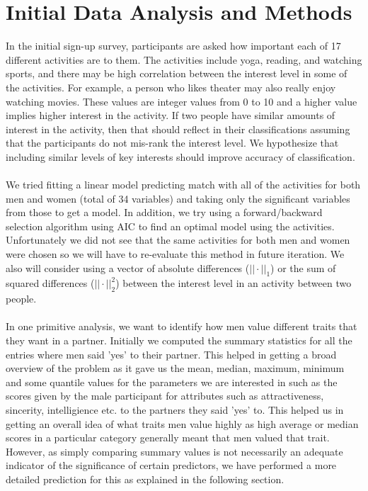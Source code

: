 \documentclass{article}
\begin{document}
\section{Initial Data Analysis and Methods}
In the initial sign-up survey, participants are asked how important each of 17 different activities are to them.  The activities include yoga, reading, and watching sports, and there may be high correlation between the interest level in some of the activities.  For example, a person who likes theater may also really enjoy watching movies.  These values are integer values from 0 to 10 and a higher value implies higher interest in the activity.  If two people have similar amounts of interest in the activity, then that should reflect in their classifications assuming that the participants do not mis-rank the interest level. We hypothesize that including similar levels of key interests should improve accuracy of classification.\\  
\null\\
We tried fitting a linear model predicting match with all of the activities for both men and women (total of 34 variables) and taking only the significant variables from those to get a model.  In addition, we try using a forward/backward selection algorithm using AIC to find an optimal model using the activities.  Unfortunately we did not see that the same activities for both men and women were chosen so we will have to re-evaluate this method in future iteration.  We also will consider using a vector of absolute differences ($||\cdot||_1$) or the sum of squared differences ($||\cdot||_2^2$) between the interest level in an activity between two people. \\
\null\\
In one primitive analysis, we want to identify how men value different traits that they want in a partner. Initially we computed the summary statistics for all the entries where men said 'yes' to their partner. This helped in getting a broad overview of the problem as it gave us the mean, median, maximum, minimum and some quantile values for the parameters we are interested in such as the scores given by the male participant for attributes such as attractiveness, sincerity, intelligience etc. to the partners they said 'yes' to. This helped us in getting an overall idea of what traits men value highly as high average or median scores in a particular category generally meant that men valued that trait. However, as simply comparing summary values is not necessarily an adequate indicator of the significance of certain predictors, we have performed a more detailed prediction for this as explained in the following section. \\
\end{document}
